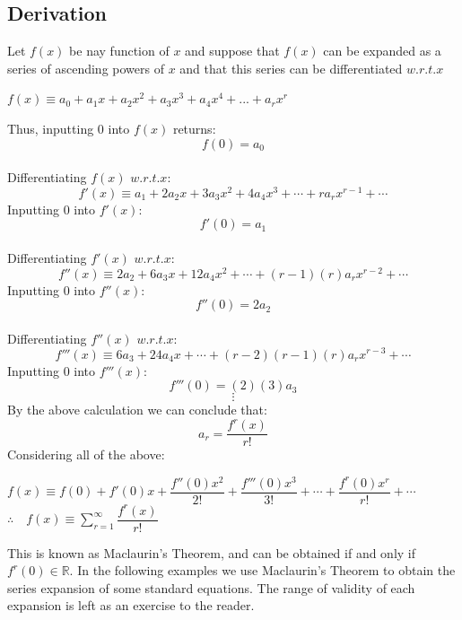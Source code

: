 \documentclass[12pt, a4paper]{report}
\theoremstyle{definition}
\begin{document}
	\subsection{Derivation}
	Let $f(x)$ be nay function of $ x $ and suppose that $ f(x) $ can be expanded as a series of ascending powers of $ x $ and that this series can be differentiated $ w.r.t. x $
	\begin{center}
		$	f(x) \equiv a_0   + a_{1}x  + a_{2}x^2 + a_{3}x^3 + a_{4}x^4 + ... +	 a_{r}x^r$\\
	\end{center}
	Thus, inputting $0$ into $f(x)$ returns:
	$$\boxed{f(0) = a_{0}}$$\\
	Differentiating  $f(x)$ $w.r.t.x\colon$ 
	$$f'(x) \equiv a_{1} + 2a_{2}x + 3a_{3}x^2 + 4a_4x^3 + \cdots + ra_{r}x^{r-1} + \cdots$$
	Inputting $0$ into $f'(x)\colon$
	$$\boxed{f'(0) = a_1}$$\\
	Differentiating $f'(x)$ $w.r.t.x\colon$
	$$f''(x) \equiv 2a_{2} + 6a_{3}x + 12a_4x^2 + \cdots + (r-1)(r)a_{r}x^{r-2} + \cdots$$
	Inputting $0$ into $f''(x)\colon$
	$$\boxed{f''(0) = 2a_2}$$\\
	Differentiating $f''(x)$ $w.r.t.x\colon$
	$$f'''(x) \equiv 6a_{3} +24a_4x + \cdots + (r-2)(r-1)(r)a_{r}x^{r-3}+ \cdots$$
	Inputting $0$ into $f'''(x)\colon$
	$$\boxed{f'''(0) = (2)(3)a_3}$$
	$$\vdots$$
	\newpage
	By the above calculation we can conclude that: 
	$$\boxed{a_r = \frac{f^r(x)}{r!}}$$
	Considering all of the above: 
	
	\begin{center}
		\begin{tcolorbox}[center title,hbox,    %
			lifted shadow={1mm}{-2mm}{3mm}{0.1mm}%
			{black!50!white}]
			\begin{varwidth}{\textwidth}
				\begin{center}
					$f(x) \equiv f(0) + f'(0)x + \dfrac{f''(0)x^2}{2!} + \dfrac{f'''(0)x^3}{3!} + \cdots + \dfrac{f^r(0)x^r}{r!} + \cdots$\\
					\bigskip
					$\displaystyle \therefore \quad f(x) \equiv \sum_{r=1}^{\infty} \dfrac{f^r(x)}{r!}$
				\end{center}
			\end{varwidth}
		\end{tcolorbox} 
	\end{center}
	
	
	This is known as Maclaurin's Theorem, and can be obtained if and only if $f^r(0) \in \mathbb{R}$. In the following examples we use Maclaurin's Theorem to obtain the series expansion of some standard equations. The range of validity of each expansion is left as an exercise to the reader.
\end{document}

